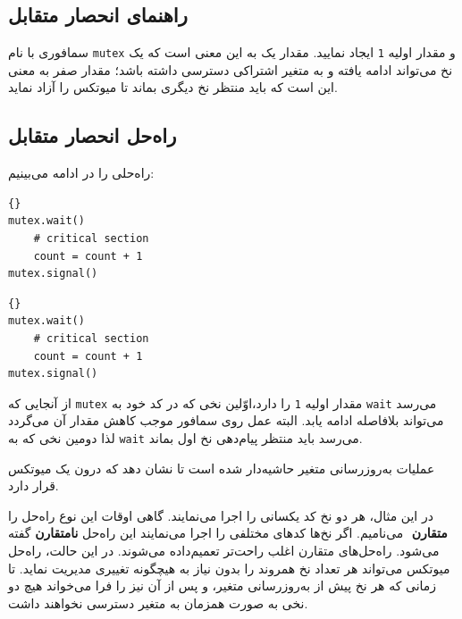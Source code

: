 \documentclass{book}
\newcommand{\clearemptydoublepage}{}%
\begin{document}
\clearemptydoublepage
\subsection{راهنمای انحصار متقابل}

    سمافوری با نام \texttt{mutex} و مقدار اولیه \texttt{1} ایجاد نمایید. 
    مقدار یک به این معنی است که یک نخ می‌تواند ادامه یافته و به متغیر اشتراکی دسترسی داشته باشد؛ مقدار صفر به معنی این است که 
    باید منتظر نخ دیگری بماند تا میوتکس را آزاد نماید. 


\clearemptydoublepage
\subsection{  راه‌حل انحصار متقابل}

    راه‌حلی را در ادامه می‌بینیم:

\begin{latin}
\begin{minipage}[t]{2in}
\begin{latin}
\begin{lstlisting}[title=\rl{نخ \lr{A}}]{}
mutex.wait()
    # critical section
    count = count + 1
mutex.signal()
\end{lstlisting}
\end{latin}
\end{minipage}
\hfill
\begin{minipage}[t]{2in}
\begin{latin}
\begin{lstlisting}[title=\rl{نخ \lr{B}}]{}
mutex.wait()
    # critical section
    count = count + 1
mutex.signal()
\end{lstlisting}
\end{latin}
\end{minipage}
\end{latin}

    از آنجایی که \texttt{mutex} مقدار اولیه  \texttt{1} را دارد،اوّلین نخی که در کد خود به \texttt{wait} می‌رسد می‌تواند بلافاصله ادامه یابد.
    البته عمل  روی سمافور موجب کاهش مقدار آن می‌گردد لذا دومین نخی که به  \texttt{wait} می‌رسد باید منتظر پیام‌دهی نخ اول بماند. 

    عملیات به‌روزرسانی متغیر حاشیه‌دار شده است تا نشان دهد که درون یک میوتکس  قرار دارد. 
    
    در این مثال، هر دو نخ کد یکسانی را اجرا می‌نمایند. گاهی اوقات این نوع راه‌حل را \textbf{متقارن} ‌
    می‌نامیم. اگر نخ‌ها کدهای مختلفی را اجرا می‌نمایند این راه‌حل \textbf{نامتقارن}
    گفته می‌شود. راه‌حل‌های متقارن اغلب راحت‌تر تعمیم‌داده می‌شوند. در این حالت، راه‌حل  میوتکس می‌تواند هر تعداد نخ همروند را بدون 
    نیاز به هیچگونه تغییری مدیریت نماید. تا زمانی که هر نخ پیش از به‌روزرسانی متغیر،    و پس از آن نیز    
    را فرا می‌خواند هیچ دو نخی به صورت همزمان به متغیر  دسترسی نخواهند داشت.
\end{document}
